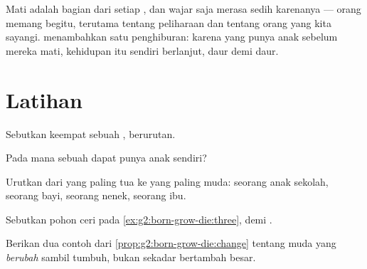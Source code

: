 \begin{remark}\label{rem:g2:born-grow-die:death}
Mati adalah bagian dari setiap , dan wajar saja merasa sedih
karenanya --- orang memang begitu, terutama tentang  peliharaan
dan tentang orang yang kita sayangi.  menambahkan satu
penghiburan: karena yang  punya anak sebelum mereka mati,
kehidupan itu sendiri berlanjut, daur demi daur.
\end{remark}

\section{Latihan}

\begin{exercise}[$\star$]\label{exo:g2:born-grow-die:1}
Sebutkan keempat  sebuah , berurutan.
\end{exercise}

\begin{exercise}[$\star$]\label{exo:g2:born-grow-die:2}
Pada  mana sebuah  dapat punya anak sendiri?
\end{exercise}

\begin{exercise}[$\star$]\label{exo:g2:born-grow-die:3}
Urutkan dari yang paling tua ke yang paling muda: seorang anak
sekolah, seorang bayi, seorang nenek, seorang ibu.
\end{exercise}

\begin{exercise}[$\star$]\label{exo:g2:born-grow-die:4}
Sebutkan  pohon ceri pada
\cref{ex:g2:born-grow-die:three},  demi .
\end{exercise}

\begin{exercise}[$\star$]\label{exo:g2:born-grow-die:5}
Berikan dua contoh dari \cref{prop:g2:born-grow-die:change} tentang
 muda yang \emph{berubah} sambil tumbuh, bukan sekadar
bertambah besar.
\end{exercise}

